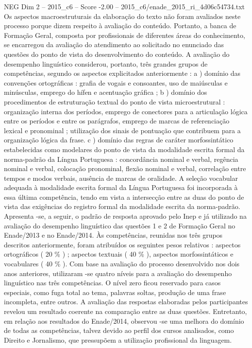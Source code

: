 \begin{textsample}{NEG Dim 2 – 2015\_c6 – Score -2.00 – 2015\_c6/enade\_2015\_ri\_4d06c54734.txt}
Os aspectos macroestruturais da elaboração do texto não foram avaliados neste processo porque dizem respeito à avaliação do conteúdo.
Portanto, a banca de Formação Geral, composta por profissionais de diferentes áreas do conhecimento, se encarregou da avaliação do atendimento ao solicitado no enunciado das questões do ponto de vista do desenvolvimento do conteúdo.
A avaliação do desempenho linguístico considerou, portanto, três grandes grupos de competências, segundo os aspectos explicitados anteriormente : a ) domínio das convenções ortográficas : grafia de vogais e consoantes, uso de maiúsculas e minúsculas, emprego do hífen e acentuação gráfica ; b ) domínio dos procedimentos de estruturação textual do ponto de vista microestrutural : organização interna dos períodos, emprego de conectores para a articulação lógica entre os períodos e entre os parágrafos, emprego de marcas de referenciação lexical e pronominal ; utilização dos sinais de pontuação que contribuem para a organização lógica da frase. c ) domínio das regras de caráter morfossintático estabelecidas como modelares do ponto de vista da modalidade escrita formal da norma-padrão da Língua Portuguesa : concordância nominal e verbal, regência nominal e verbal, colocação pronominal, flexão nominal e verbal, correlação entre tempos e modos verbais, ausência de marcas de oralidade.
A seleção vocabular adequada à modalidade escrita formal da Língua Portuguesa foi incorporada à essa última competência, tendo em vista a intersecção entre as duas do ponto de vista das exigências do registro formal da modalidade escrita da norma-padrão.
Apresenta -se, a seguir, o padrão de resposta aprovado pelo Inep e já utilizado na avaliação do desempenho linguístico das questões 1 e 2 de Formação Geral no Enade/2013 e no Enade/2014.
Às competências, reunidas nos três grupos descritos anteriormente, foram atribuídos os seguintes pesos relativos : aspectos ortográficos ( 20 \% ) ; aspectos textuais ( 40 \% ), aspectos morfossintáticos e vocabulares ( 40 \% ).
Com base na avaliação do processo desenvolvido nos dois anos anteriores, utilizaram -se quatro níveis para a avaliação do desempenho linguístico nas três competências.
O nível zero ficou reservado para casos especiais, como fuga total ao tema, palavras soltas, produção de uma frase incompleta, entre outros.
A avaliação das respostas elaboradas pelos participantes revelou um resultado coerente na comparação entre as duas questões.
Entretanto, em relação aos resultados do Enade/2014, observou -se uma melhora do domínio de todas as competências, talvez devido ao perfil dos cursos analisados, como Direito e Jornalismo, que pressupõem a utilização profissional da linguagem.

\end{textsample}

